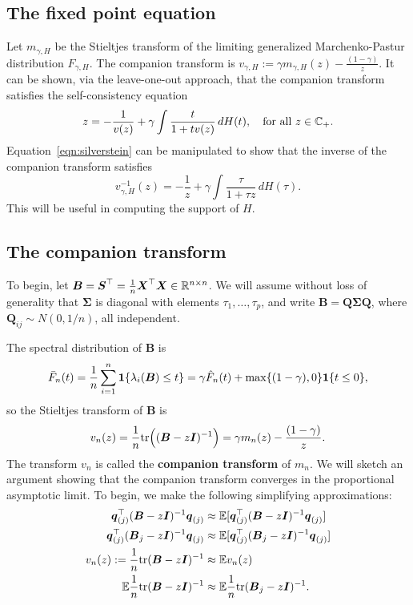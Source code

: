 \documentclass{article}
\newcommand{\bq}{\boldsymbol{q}}
\newcommand{\bX}{\boldsymbol{X}}
\newcommand{\bSigma}{\boldsymbol{\Sigma}}
\newcommand{\bS}{\boldsymbol{S}}
\newcommand{\bB}{\boldsymbol{B}}
\newcommand{\bQ}{\boldsymbol{Q}}
\newcommand{\bI}{\boldsymbol{I}}
\begin{document}
\subsection{The fixed point equation}
Let $m_{\gamma,H}$ be the Stieltjes transform of the limiting generalized Marchenko-Pastur distribution $F_{\gamma,H}$. The companion transform is $v_{\gamma,H} := \gamma m_{\gamma,H}(z) - \frac{(1 - \gamma)}{z}$. It can be shown, via the leave-one-out approach, that the companion transform satisfies the self-consistency equation
\begin{equation}
	\label{eqn:silverstein}
	z = -\frac{1}{v(z)} + \gamma \int \frac{t}{1 + tv(z)} \,dH(t), \quad \textrm{for all $z \in \mathbb{C}_{+}$.}
\end{equation}
Equation~\eqref{eqn:silverstein} can be manipulated to show that the inverse of the companion transform satisfies
\begin{equation}
\label{eqn:inverse-fixed-point}
v_{\gamma,H}^{-1}(z) = -\frac{1}{z} + \gamma\int\frac{\tau}{1 + \tau z} \,dH(\tau). 
\end{equation} 
This will be useful in computing the support of $H$. 

\subsection{The companion transform}
To begin, let $\bB = \bS^{\top} = \frac{1}{n} \bX^{\top} \bX \in \Reals^{n \times n}$. We will assume without loss of generality that $\bSigma$ is diagonal with elements $\tau_1,\ldots,\tau_p$, and write $\bB = \bQ \bSigma \bQ$, where $\bQ_{ij} \sim N(0,1/n)$, all independent. 

The spectral distribution of $\bB$ is 
$$
\bar{F}_n(t) = \frac{1}{n}\sum_{i = 1}^{n} \1\{\lambda_i(\bB) \leq t\} = \gamma \hat{F}_n(t) + \max\{(1 - \gamma),0\} \1\{t \leq 0\},
$$
so the Stieltjes transform of $\bB$ is 
$$
v_n(z) = \frac{1}{n} \tr\Big((\bB - z\bI)^{-1}\Big) = \gamma m_n(z) - \frac{(1 - \gamma)}{z}.
$$
The transform $v_n$ is called the {\bf companion transform} of $m_n$. We will sketch an argument showing that the companion transform converges in the proportional asymptotic limit. To begin, we make the following simplifying approximations:
\begin{align*}
	\bq_{(j)}^{\top} (\bB - z\bI)^{-1} \bq_{(j)} & \approx \mathbb{E}[\bq_{(j)}^{\top} (\bB - z\bI)^{-1} \bq_{(j)}] \\
	\bq_{(j)}^{\top} (\bB_j - z\bI)^{-1} \bq_{(j)} & \approx \mathbb{E}[\bq_{(j)}^{\top} (\bB_j - z\bI)^{-1} \bq_{(j)}] \\
	v_n(z) := \frac{1}{n}\tr(\bB - z \bI)^{-1} & \approx \mathbb{E} v_n(z) \\
	\mathbb{E}{\frac{1}{n}\tr(\bB - z \bI)^{-1}} & \approx \mathbb{E}{\frac{1}{n}\tr(\bB_j - z \bI)^{-1}}.
\end{align*}
\end{document}
